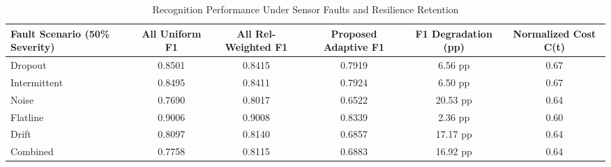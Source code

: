 \begin{table}[htbp]
\caption{Recognition Performance Under Sensor Faults and Resilience Retention}
\label{tab:faulted_comparison}
\centering
\begin{tabular}{lccccc}
\hline
Fault Scenario (50\% Severity) & All Uniform F1 & All Rel-Weighted F1 & Proposed Adaptive F1 & F1 Degradation (pp) & Normalized Cost C(t) \\ \hline
Dropout & 0.8501 & 0.8415 & 0.7919 & 6.56 pp & 0.67 \\
Intermittent & 0.8495 & 0.8411 & 0.7924 & 6.50 pp & 0.67 \\
Noise & 0.7690 & 0.8017 & 0.6522 & 20.53 pp & 0.64 \\
Flatline & 0.9006 & 0.9008 & 0.8339 & 2.36 pp & 0.60 \\
Drift & 0.8097 & 0.8140 & 0.6857 & 17.17 pp & 0.64 \\
Combined & 0.7758 & 0.8115 & 0.6883 & 16.92 pp & 0.64 \\
\hline
\end{tabular}
\end{table}

